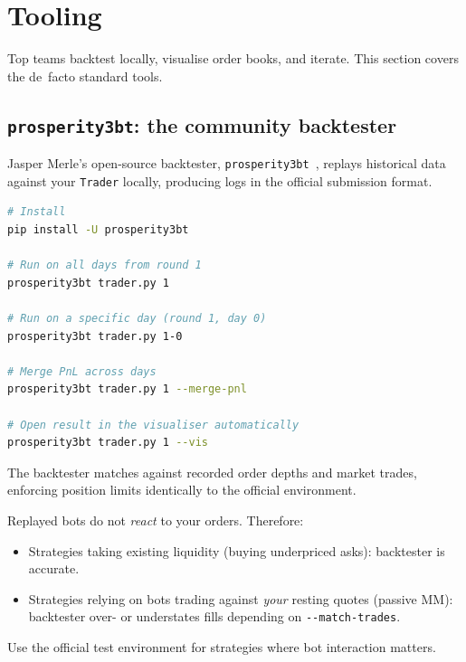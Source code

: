 \section{Tooling}
\label{sec:prosperity_tooling}

Top teams backtest locally, visualise order books, and iterate.  This
section covers the de~facto standard tools.

\subsection{\texttt{prosperity3bt}: the community backtester}

Jasper Merle's open-source backtester,
\texttt{prosperity3bt}~\citep{jmerle_backtester}, replays historical
data against your \texttt{Trader} locally, producing logs in the
official submission format.

\begin{lstlisting}[language=bash, caption={Installing and running the
  backtester.}, label={lst:backtester}]
# Install
pip install -U prosperity3bt

# Run on all days from round 1
prosperity3bt trader.py 1

# Run on a specific day (round 1, day 0)
prosperity3bt trader.py 1-0

# Merge PnL across days
prosperity3bt trader.py 1 --merge-pnl

# Open result in the visualiser automatically
prosperity3bt trader.py 1 --vis
\end{lstlisting}

The backtester matches against recorded order depths and market trades,
enforcing position limits identically to the official environment.

\begin{pitfallbox}
Replayed bots do not \emph{react} to your orders.  Therefore:
\begin{itemize}
  \item Strategies taking existing liquidity (buying underpriced asks):
  backtester is accurate.
  \item Strategies relying on bots trading against \emph{your} resting
  quotes (passive MM): backtester over- or understates fills depending
  on \texttt{-{}-match-trades}.
\end{itemize}
Use the official test environment for strategies where bot interaction
matters.
\end{pitfallbox}

